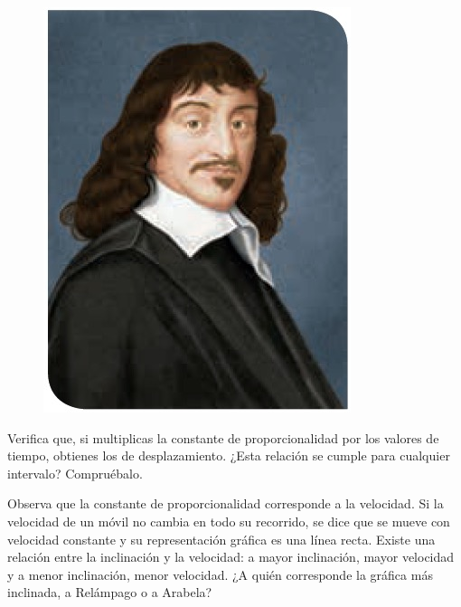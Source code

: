 \documentclass[11pt]{book}
\begin{document}
\begin{minipage}[t]{0.3\linewidth}
    \begin{figure}[H]
        \centering
        \includegraphics[width=\linewidth]{descartes.jpg}
        \label{fig:descartes}
    \end{figure}
\end{minipage}

Verifica que, si multiplicas la constante de proporcionalidad por los valores de tiempo,
obtienes los de desplazamiento. ¿Esta relación se cumple para cualquier intervalo? Compruébalo.

Observa que la constante de proporcionalidad corresponde a la velocidad. Si la velocidad
de un móvil no cambia en todo su recorrido, se dice que se mueve con velocidad constante
y su representación gráfica es una línea recta. Existe una relación entre la inclinación
y la velocidad: a mayor inclinación, mayor velocidad y a menor inclinación, menor velocidad.
¿A quién corresponde la gráfica más inclinada, a Relámpago o a Arabela?
\end{document}
